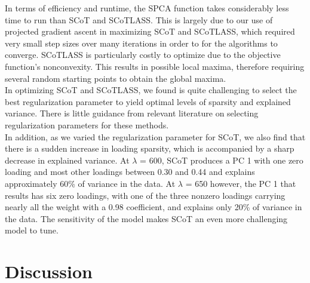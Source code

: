 \documentclass[11pt,letterpaper]{report}
\begin{document}
In terms of efficiency and runtime, the SPCA function takes considerably less time to run than SCoT and SCoTLASS. This is largely due to our use of projected gradient ascent in maximizing SCoT and SCoTLASS, which required very small step sizes over many iterations in order to for the algorithms to converge. SCoTLASS is particularly costly to optimize due to the objective function's nonconvexity. This results in possible local maxima, therefore requiring several random starting points to obtain the global maxima.\\

In optimizing SCoT and SCoTLASS, we found is quite challenging to select the best regularization parameter to yield optimal levels of sparsity and explained variance. There is little guidance from relevant literature on selecting regularization parameters for these methods.\\

In addition, as we varied the regularization parameter for SCoT, we also find that there is a sudden increase in loading sparsity, which is accompanied by a sharp decrease in explained variance. At $\lambda$ = 600, SCoT produces a PC 1 with one zero loading and most other loadings between 0.30 and 0.44 and explains approximately 60\% of variance in the data. At $\lambda$ = 650 however, the PC 1 that results has six zero loadings, with one of the three nonzero loadings carrying nearly all the weight with a 0.98 coefficient, and explains only 20\% of variance in the data. The sensitivity of the model makes SCoT an even more challenging model to tune.

\section*{Discussion}

%
%

\end{document}
